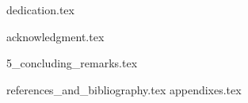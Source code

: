 \documentclass[11pt]{book}
\begin{document}
    \frontmatter

    \def\contentsname{ÍNDICE}
    \def\listfigurename{ÍNDICE DE FIGURAS}
    \def\listtablename{TABLAS}
    \def\chaptername{Capítulo}

    {dedication.tex}

    {acknowledgment.tex}

    \clearpage

    \thispagestyle{empty}

    \tableofcontents

    \clearpage

    \thispagestyle{empty}

    \listoffigures

    \clearpage

    \thispagestyle{empty}

    \listoftables

    \mainmatter

    

    

    

    

    {5_concluding_remarks.tex}

    \backmatter

    {references_and_bibliography.tex}
    {appendixes.tex}
\end{document}
